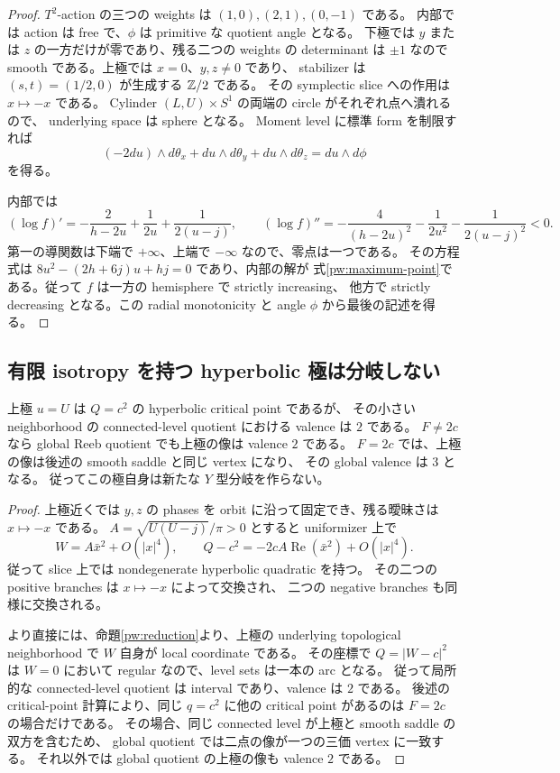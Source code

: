 \begin{proof}
$T^2$-action の三つの weights は $(1,0),(2,1),(0,-1)$ である。
内部では action は free で、$\phi$ は primitive な quotient angle となる。
下極では $y$ または $z$ の一方だけが零であり、残る二つの weights の determinant は
$\pm1$ なので smooth である。上極では $x=0$、$y,z\ne0$ であり、
stabilizer は $(s,t)=(1/2,0)$ が生成する $\mathbb Z/2$ である。
その symplectic slice への作用は $x\mapsto-x$ である。
Cylinder $(L,U)\times S^1$ の両端の circle がそれぞれ点へ潰れるので、
underlying space は sphere となる。
Moment level に標準 form を制限すれば
\[
 (-2du)\wedge d\theta_x+du\wedge d\theta_y+du\wedge d\theta_z
       =du\wedge d\phi
\]
を得る。

内部では
\[
 (\log f)'=-\frac2{h-2u}+\frac1{2u}+\frac1{2(u-j)},\qquad
 (\log f)''=-\frac4{(h-2u)^2}-\frac1{2u^2}-\frac1{2(u-j)^2}<0.
\]
第一の導関数は下端で $+\infty$、上端で $-\infty$ なので、零点は一つである。
その方程式は $8u^2-(2h+6j)u+hj=0$ であり、内部の解が
式\eqref{pw:maximum-point}である。従って $f$ は一方の hemisphere で strictly increasing、
他方で strictly decreasing となる。この radial monotonicity と angle $\phi$ から最後の記述を得る。
\end{proof}

\subsection{有限 isotropy を持つ hyperbolic 極は分岐しない}

\begin{proposition}
\label{pw:orbifold-valence}
上極 $u=U$ は $Q=c^2$ の hyperbolic critical point であるが、
その小さい neighborhood の connected-level quotient における valence は $2$ である。
$F\ne2c$ なら global Reeb quotient でも上極の像は valence $2$ である。
$F=2c$ では、上極の像は後述の smooth saddle と同じ vertex になり、
その global valence は $3$ となる。
従ってこの極自身は新たな $Y$ 型分岐を作らない。
\end{proposition}

\begin{proof}
上極近くでは $y,z$ の phases を orbit に沿って固定でき、残る曖昧さは $x\mapsto-x$ である。
$A=\sqrt{U(U-j)}/\pi>0$ とすると uniformizer 上で
\[
 W=A\bar x^2+O(|x|^4),\qquad
 Q-c^2=-2cA\operatorname{Re}(\bar x^2)+O(|x|^4).
\]
従って slice 上では nondegenerate hyperbolic quadratic を持つ。
その二つの positive branches は $x\mapsto-x$ によって交換され、
二つの negative branches も同様に交換される。

より直接には、命題\ref{pw:reduction}より、上極の underlying topological neighborhood で
$W$ 自身が local coordinate である。
その座標で $Q=|W-c|^2$ は $W=0$ において regular なので、level sets は一本の arc となる。
従って局所的な connected-level quotient は interval であり、valence は $2$ である。
後述の critical-point 計算により、同じ $q=c^2$ に他の critical point があるのは $F=2c$ の場合だけである。
その場合、同じ connected level が上極と smooth saddle の双方を含むため、
global quotient では二点の像が一つの三価 vertex に一致する。
それ以外では global quotient の上極の像も valence $2$ である。
\end{proof}

